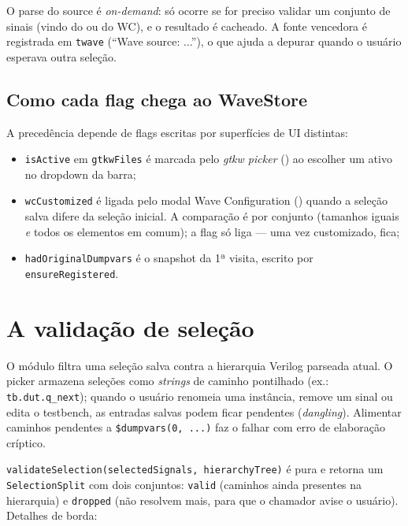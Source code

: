O parse do source é \emph{on-demand}: só ocorre se for preciso validar um
conjunto de sinais (vindo do  ou do WC), e o resultado é cacheado.
A fonte vencedora é registrada em \lstinline|twave| (\enquote{Wave source:
...}), o que ajuda a depurar quando o usuário esperava outra seleção.

\subsection{Como cada flag chega ao WaveStore}

A precedência depende de flags escritas por superfícies de UI distintas:

\begin{itemize}[leftmargin=*]
  \item \lstinline|isActive| em \lstinline|gtkwFiles| é marcada pelo \emph{gtkw
    picker} () ao escolher um  ativo no
    dropdown da barra;
  \item \lstinline|wcCustomized| é ligada pelo modal Wave Configuration
    () quando a seleção salva difere da
    seleção inicial. A comparação é por conjunto (tamanhos iguais \emph{e} todos
    os elementos em comum); a flag só liga --- uma vez customizado, fica;
  \item \lstinline|hadOriginalDumpvars| é o snapshot da 1ª visita, escrito por
    \lstinline|ensureRegistered|.
\end{itemize}

\section{A validação de seleção}

O módulo  filtra uma seleção salva contra
a hierarquia Verilog parseada atual. O picker armazena seleções como
\emph{strings} de caminho pontilhado (ex.: \lstinline|tb.dut.q_next|); quando o
usuário renomeia uma instância, remove um sinal ou edita o testbench, as
entradas salvas podem ficar pendentes (\emph{dangling}). Alimentar caminhos
pendentes a \lstinline|$dumpvars(0, ...)| faz o  falhar com erro
de elaboração críptico.

\lstinline|validateSelection(selectedSignals, hierarchyTree)| é pura e retorna
um \lstinline|SelectionSplit| com dois conjuntos: \lstinline|valid| (caminhos
ainda presentes na hierarquia) e \lstinline|dropped| (não resolvem mais, para
que o chamador avise o usuário). Detalhes de borda:

